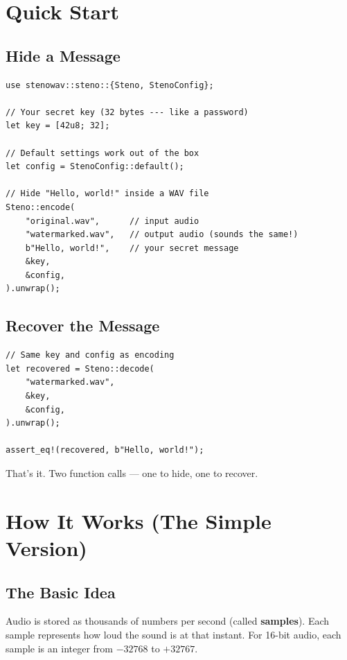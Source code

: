 \documentclass[11pt,a4paper]{article}
\begin{document}
\section{Quick Start}

\subsection{Hide a Message}

\begin{lstlisting}[style=rust]
use stenowav::steno::{Steno, StenoConfig};

// Your secret key (32 bytes --- like a password)
let key = [42u8; 32];

// Default settings work out of the box
let config = StenoConfig::default();

// Hide "Hello, world!" inside a WAV file
Steno::encode(
    "original.wav",      // input audio
    "watermarked.wav",   // output audio (sounds the same!)
    b"Hello, world!",    // your secret message
    &key,
    &config,
).unwrap();
\end{lstlisting}

\subsection{Recover the Message}

\begin{lstlisting}[style=rust]
// Same key and config as encoding
let recovered = Steno::decode(
    "watermarked.wav",
    &key,
    &config,
).unwrap();

assert_eq!(recovered, b"Hello, world!");
\end{lstlisting}

That's it.  Two function calls --- one to hide, one to recover.


\section{How It Works (The Simple Version)}

\subsection{The Basic Idea}

Audio is stored as thousands of numbers per second (called \textbf{samples}).
Each sample represents how loud the sound is at that instant.  For 16-bit
audio, each sample is an integer from $-32768$ to $+32767$.
\end{document}
